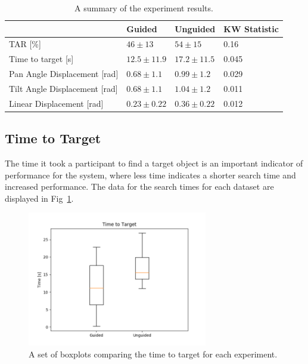 \documentclass[runningheads]{llncs}
\newcommand\todo[1]{\textcolor{red}{#1}}
\begin{document}
\begin{table}
  \centering
  \caption{A summary of the experiment results. }\label{tab:results}
  \begin{tabular}{p{5cm}p{2cm}p{2cm}p{2.5cm}}
    \toprule
    & \textbf{Guided} & \textbf{Unguided}  & \textbf{KW Statistic} \\\midrule
    TAR [\%]           & $46\pm13$ & $54\pm15$ &  0.16 \\\midrule
    Time to target [s] & $12.5\pm11.9$ & $17.2\pm11.5$ & 0.045 \\\midrule
    Pan Angle Displacement [rad] & $0.68\pm1.1$ & $0.99\pm1.2$ & 0.029 \\\midrule
    Tilt Angle Displacement [rad] & $0.68\pm1.1$ & $1.04\pm1.2$ & 0.011 \\\midrule
    Linear Displacement [rad] & $0.23\pm0.22$ & $0.36\pm0.22$ & 0.012 \\\midrule
    \bottomrule
  \end{tabular}
\end{table}

\subsection{Time to Target}

The time it took a participant to find a target object is an important indicator of performance for the system, where less time indicates a shorter search time and increased performance.
The data for the search times for each dataset are displayed in Fig~\ref{fig:boxplot-time}.%

\begin{figure}[h]
  \centering
  \includegraphics[width=0.7\textwidth]{figures/boxplot_time_to_target.png}
  \caption{A set of boxplots comparing the time to target for each experiment. }\label{fig:boxplot-time}
\end{figure}
\end{document}
